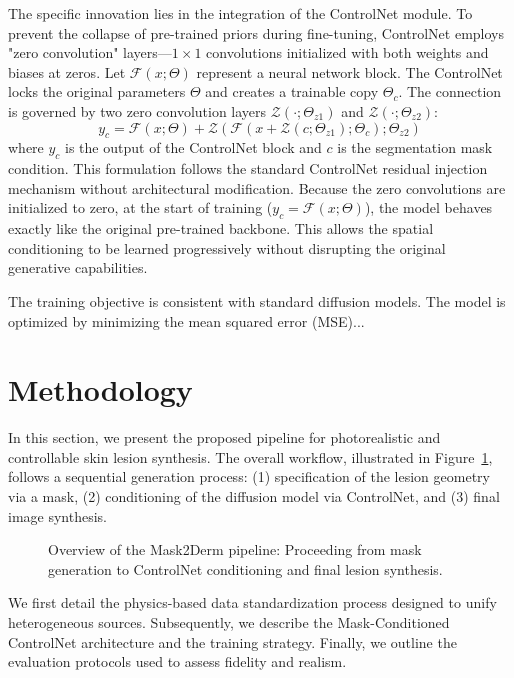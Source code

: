\documentclass[a4paper,11pt]{article}
\begin{document}
The specific innovation lies in the integration of the ControlNet module. To prevent the collapse of pre-trained priors during fine-tuning, ControlNet employs "zero convolution" layers---$1\times1$ convolutions initialized with both weights and biases at zeros. Let $\mathcal{F}(x; \Theta)$ represent a neural network block. The ControlNet locks the original parameters $\Theta$ and creates a trainable copy $\Theta_c$. The connection is governed by two zero convolution layers $\mathcal{Z}(\cdot; \Theta_{z1})$ and $\mathcal{Z}(\cdot; \Theta_{z2})$:
\begin{equation}
    y_c = \mathcal{F}(x; \Theta) + \mathcal{Z}(\mathcal{F}(x + \mathcal{Z}(c; \Theta_{z1}); \Theta_c); \Theta_{z2})
\end{equation}
where $y_c$ is the output of the ControlNet block and $c$ is the segmentation mask condition. This formulation follows the standard ControlNet residual injection mechanism without architectural modification. Because the zero convolutions are initialized to zero, at the start of training ($y_c = \mathcal{F}(x; \Theta)$), the model behaves exactly like the original pre-trained backbone. This allows the spatial conditioning to be learned progressively without disrupting the original generative capabilities.

The training objective is consistent with standard diffusion models. The model is optimized by minimizing the mean squared error (MSE)... 


\section{Methodology}\label{sec:method}

In this section, we present the proposed pipeline for photorealistic and controllable skin lesion synthesis. The overall workflow, illustrated in Figure~\ref{fig:pipeline}, follows a sequential generation process: (1) specification of the lesion geometry via a mask, (2) conditioning of the diffusion model via ControlNet, and (3) final image synthesis.

\begin{figure}[H]
    \centering
    \resizebox{\linewidth}{!}{}
    \caption{Overview of the Mask2Derm pipeline: Proceeding from mask generation to ControlNet conditioning and final lesion synthesis.}
    \label{fig:pipeline}
\end{figure}

We first detail the physics-based data standardization process designed to unify heterogeneous sources. Subsequently, we describe the Mask-Conditioned ControlNet architecture and the training strategy. Finally, we outline the evaluation protocols used to assess fidelity and realism.
\end{document}
